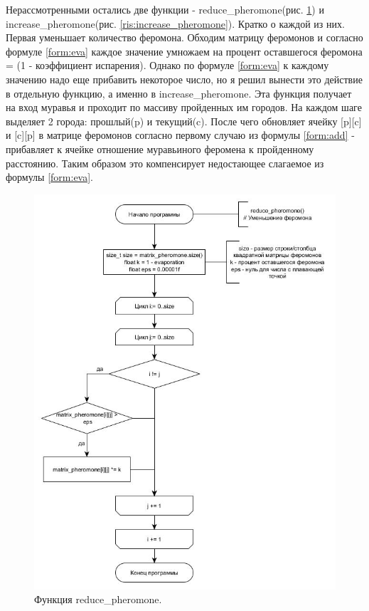 \documentclass[a4paper, 14pt]{article}
\begin{document}
Нерассмотренными остались две функции -  reduce\_pheromone(рис. \ref{ris:reduce_pheromone}) и 
increase\_pheromone(рис. \ref{ris:increase_pheromone}).  Кратко о каждой из них. Первая уменьшает количество феромона. Обходим матрицу феромонов и согласно формуле \ref{form:eva} каждое значение умножаем на процент оставшегося феромона = (1 - коэффициент испарения). Однако по формуле \ref{form:eva} к каждому значению надо еще прибавить некоторое число, но я решил вынести это действие в отдельную функцию, а именно в increase\_pheromone. Эта функция получает на вход муравья и проходит по массиву пройденных им городов. На каждом шаге выделяет 2 города: прошлый(p) и текущий(c). После чего обновляет ячейку [p][c] и [c][p] в матрице феромонов согласно первому случаю из формулы \ref{form:add} - прибавляет к ячейке отношение муравьиного феромена к пройденному расстоянию. Таким образом это компенсирует недостающее слагаемое из формулы \ref{form:eva}.\newpage

\begin{figure}[h!]
\center
\includegraphics[scale=0.6]{reduce_pheromone.jpg}
\caption{Функция reduce\_pheromone.}
\label{ris:reduce_pheromone}
\end{figure}\newpage
\end{document}
